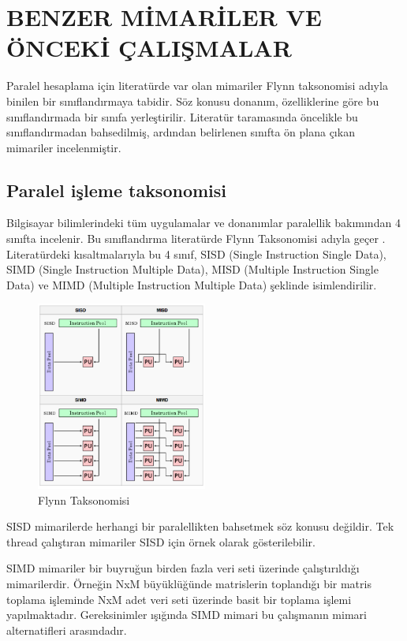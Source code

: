 \chapter{BENZER MİMARİLER VE ÖNCEKİ ÇALIŞMALAR}
Paralel hesaplama için literatürde var olan mimariler Flynn taksonomisi adıyla binilen bir sınıflandırmaya tabidir. Söz konusu donanım, özelliklerine göre bu sınıflandırmada bir sınıfa yerleştirilir. Literatür taramasında öncelikle bu sınıflandırmadan bahsedilmiş, ardından belirlenen sınıfta ön plana çıkan mimariler incelenmiştir.

\section{Paralel işleme taksonomisi}
Bilgisayar bilimlerindeki tüm uygulamalar ve donanımlar paralellik bakımından 4 sınıfta incelenir. Bu sınıflandırma literatürde Flynn Taksonomisi adıyla geçer \cite{flynnTaxonomy}. Literatürdeki kısaltmalarıyla bu 4 sınıf, SISD (Single Instruction Single Data), SIMD (Single Instruction Multiple Data), MISD (Multiple Instruction Single Data) ve MIMD (Multiple Instruction Multiple Data) şeklinde isimlendirilir. 

\begin{figure}
\centering
\shorthandoff{=}
\includegraphics[width=0.5\textwidth]{gorsel/flynnTaxonomy.png}
\shorthandoff{=}
\caption{Flynn Taksonomisi}
\label{overflow}
\end{figure}

SISD mimarilerde herhangi bir paralellikten bahsetmek söz konusu değildir. Tek thread çalıştıran mimariler SISD için örnek olarak gösterilebilir. \par

SIMD mimariler bir buyruğun birden fazla veri seti üzerinde çalıştırıldığı mimarilerdir. Örneğin NxM büyüklüğünde matrislerin toplandığı bir matris toplama işleminde NxM adet veri seti üzerinde basit bir toplama işlemi yapılmaktadır. Gereksinimler ışığında SIMD mimari bu çalışmanın mimari alternatifleri arasındadır. \par

